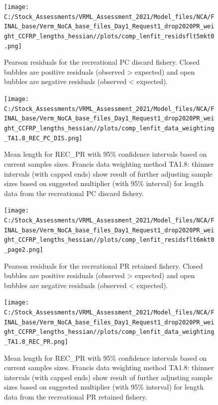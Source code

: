 \documentclass[
  english,
  a4paper,
]{article}
\begin{document}
\begin{figure}
\centering
\texttt{[image: C:/Stock\_Assessments/VRML\_Assessment\_2021/Model\_files/NCA/FINAL\_base/Verm\_NoCA\_base\_files\_Day1\_Request1\_drop2020PR\_weight\_CCFRP\_lengths\_hessian//plots/comp\_lenfit\_residsflt5mkt0.png]}
\caption{Pearson residuals for the recreational PC discard fishery. Closed bubbles are positive residuals (observed \textgreater{} expected) and open bubbles are negative residuals (observed \textless{} expected).\label{fig:len-pearson-REC-PC-DIS}}
\end{figure}

\begin{figure}
\centering
\texttt{[image: C:/Stock\_Assessments/VRML\_Assessment\_2021/Model\_files/NCA/FINAL\_base/Verm\_NoCA\_base\_files\_Day1\_Request1\_drop2020PR\_weight\_CCFRP\_lengths\_hessian//plots/comp\_lenfit\_data\_weighting\_TA1.8\_REC\_PC\_DIS.png]}
\caption{Mean length for REC\_PR with 95\% confidence intervals based on current samples sizes. Francis data weighting method TA1.8: thinner intervals (with capped ends) show result of further adjusting sample sizes based on suggested multiplier (with 95\% interval) for length data from the recreational PC discard fishery.\label{fig:mean-len-fit-REC-PC-DIS}}
\end{figure}

\begin{figure}
\centering
\texttt{[image: C:/Stock\_Assessments/VRML\_Assessment\_2021/Model\_files/NCA/FINAL\_base/Verm\_NoCA\_base\_files\_Day1\_Request1\_drop2020PR\_weight\_CCFRP\_lengths\_hessian//plots/comp\_lenfit\_residsflt6mkt0\_page2.png]}
\caption{Pearson residuals for the recreational PR retained fishery. Closed bubbles are positive residuals (observed \textgreater{} expected) and open bubbles are negative residuals (observed \textless{} expected).\label{fig:len-pearson-REC-PR}}
\end{figure}

\begin{figure}
\centering
\texttt{[image: C:/Stock\_Assessments/VRML\_Assessment\_2021/Model\_files/NCA/FINAL\_base/Verm\_NoCA\_base\_files\_Day1\_Request1\_drop2020PR\_weight\_CCFRP\_lengths\_hessian//plots/comp\_lenfit\_data\_weighting\_TA1.8\_REC\_PR.png]}
\caption{Mean length for REC\_PR with 95\% confidence intervals based on current samples sizes. Francis data weighting method TA1.8: thinner intervals (with capped ends) show result of further adjusting sample sizes based on suggested multiplier (with 95\% interval) for length data from the recreational PR retained fishery.\label{fig:mean-len-fit-REC-PR}}
\end{figure}
\end{document}
